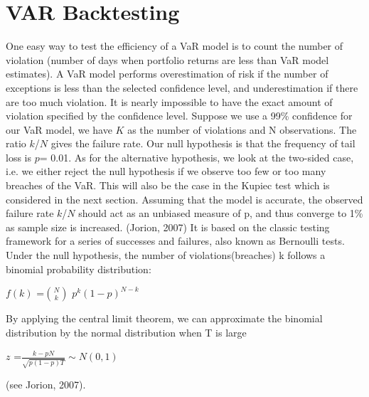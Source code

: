 \documentclass[a4paper,11pt,oneside]{book}
\begin{document}
\section{VAR Backtesting}\label{vio}
One easy way to test the efficiency of a VaR model is to count the number of violation (number of days when portfolio returns are less than VaR model estimates). A VaR model performs overestimation of risk if the number of exceptions is less than the selected confidence level, and underestimation if there are too much violation. It is nearly impossible to have the exact amount of violation specified by the confidence level.\newline\newline
Suppose we use a 99\% confidence for our VaR model, we have $K$ as the number of violations and N observations. The ratio $k$/$N$ gives the failure rate. Our null hypothesis is that the frequency of tail loss is $p$= 0.01. As for the alternative hypothesis, we look at the two-sided case, i.e. we either reject the null hypothesis if we observe too few or too many breaches of the VaR. This will also be the case in the Kupiec test which is considered in the next section.  Assuming that the model is accurate, the observed failure rate $k$/$N$
should act as an unbiased measure of p, and thus converge to 1\% as sample size is
increased. (Jorion, 2007) \newline\newline
It is based on the classic testing framework for a series of successes and failures, also known as Bernoulli tests. Under the null hypothesis, the number of violations(breaches) k follows a binomial probability distribution:
\begin{center}
	$f(k)$ =$N \choose {k}$ $p^{k}(1-p)^{N-k}$ 
\end{center}

By applying the central limit theorem, we can approximate the binomial distribution by the normal distribution when T is large
\begin{center}
	$z$ =$\frac{k-pN}{\sqrt{p(1-p)T}}\sim N(0,1)$ 
\end{center}
(see Jorion, 2007).
\end{document}
